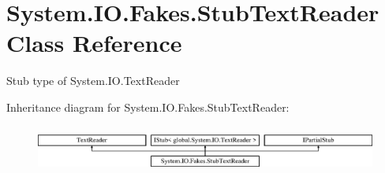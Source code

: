 \hypertarget{class_system_1_1_i_o_1_1_fakes_1_1_stub_text_reader}{\section{System.\-I\-O.\-Fakes.\-Stub\-Text\-Reader Class Reference}
\label{class_system_1_1_i_o_1_1_fakes_1_1_stub_text_reader}
}


Stub type of System.\-I\-O.\-Text\-Reader 


Inheritance diagram for System.\-I\-O.\-Fakes.\-Stub\-Text\-Reader\-:\begin{figure}[H]
\begin{center}
\leavevmode
\includegraphics[height=1.588652cm]{class_system_1_1_i_o_1_1_fakes_1_1_stub_text_reader}
\end{center}
\end{figure}
